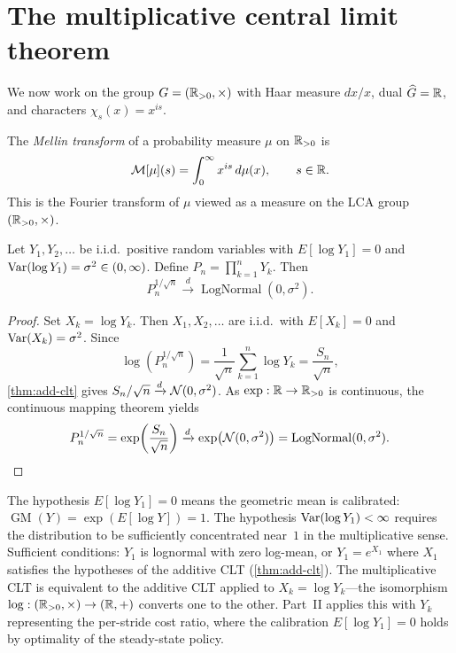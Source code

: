 \section{The multiplicative central limit theorem}

We now work on the group $G = (\mathbb{R}_{>0}, \times)$ with Haar measure $dx/x$, dual $\widehat{G} = \mathbb{R}$, and characters $\chi_s(x) = x^{is}$.

\begin{definition}\label{def:mellin}
The \emph{Mellin transform} of a probability measure $\mu$ on $\mathbb{R}_{>0}$ is
\[
\mathcal{M}[\mu](s) = \int_0^\infty x^{is}\, d\mu(x), \qquad s \in \mathbb{R}.
\]
This is the Fourier transform of $\mu$ viewed as a measure on the LCA group $(\mathbb{R}_{>0}, \times)$.
\end{definition}

\begin{theorem}\label{thm:mult-clt}
Let $Y_1, Y_2, \ldots$ be i.i.d.\ positive random variables with $E[\log Y_1] = 0$ and $\operatorname{Var}(\log Y_1) = \sigma^2 \in (0, \infty)$. Define $P_n = \prod_{k=1}^n Y_k$. Then
\[
P_n^{1/\sqrt{n}} \xrightarrow{d} \operatorname{LogNormal}(0, \sigma^2).
\]
\end{theorem}

\begin{proof}
Set $X_k = \log Y_k$. Then $X_1, X_2, \ldots$ are i.i.d.\ with $E[X_k] = 0$ and $\operatorname{Var}(X_k) = \sigma^2$. Since
\[
\log\!\left(P_n^{1/\sqrt{n}}\right) = \frac{1}{\sqrt{n}} \sum_{k=1}^n \log Y_k = \frac{S_n}{\sqrt{n}},
\]
\cref{thm:add-clt} gives $S_n/\sqrt{n} \xrightarrow{d} \mathcal{N}(0, \sigma^2)$. As $\exp : \mathbb{R} \to \mathbb{R}_{>0}$ is continuous, the continuous mapping theorem yields
\[
P_n^{1/\sqrt{n}} = \exp\!\left(\frac{S_n}{\sqrt{n}}\right) \xrightarrow{d} \exp\!\left(\mathcal{N}(0, \sigma^2)\right) = \operatorname{LogNormal}(0, \sigma^2). \qedhere
\]
\end{proof}

\begin{remark}\label{rmk:mult-clt-hypotheses}
The hypothesis $E[\log Y_1] = 0$ means the geometric mean is calibrated:
$\operatorname{GM}(Y) = \exp(E[\log Y]) = 1$.
The hypothesis $\operatorname{Var}(\log Y_1) < \infty$ requires the distribution to be
sufficiently concentrated near~$1$ in the multiplicative sense.
Sufficient conditions: $Y_1$ is lognormal with zero log-mean, or
$Y_1 = e^{X_1}$ where $X_1$ satisfies the hypotheses of the additive
CLT (\cref{thm:add-clt}).
The multiplicative CLT is equivalent to the additive CLT applied to
$X_k = \log Y_k$---the isomorphism
$\log : (\mathbb{R}_{>0}, \times) \to (\mathbb{R}, +)$ converts one to the other.
Part~II applies this with $Y_k$ representing the per-stride cost ratio,
where the calibration $E[\log Y_1] = 0$ holds by optimality of the
steady-state policy.
\end{remark}

